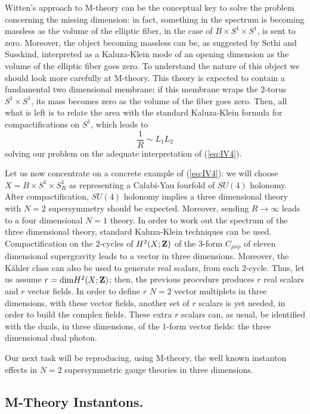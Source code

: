 Witten's approach to M-theory can be the
conceptual key to solve the problem concerning the missing dimension: in fact, something in the spectrum
is becoming massless as the volume of the elliptic fiber, in the 
case of $B \times S^1 \times S^1$, is sent to zero. Moreover, the
object becoming massless can be, as suggested by Sethi and
Susskind, interpreted as a Kaluza-Klein mode of an opening
dimension as the volume of the elliptic fiber goes zero. To
understand the nature of this object we should look more
carefully at M-theory. This theory is expected to contain a
fundamental two dimensional membrane; if this membrane wraps the
$2$-torus $S^1 \times S^1$, its mass becomes zero as the volume
of the fiber goes zero. Then, all what is left is to relate the
area with the standard Kaluza-Klein formula for compactifications
on $S^1$, which leads to 
\begin{equation}
\frac {1}{R} \sim L_1 L_2
\label{eq:IV8}
\end{equation}
solving our problem on the adequate interpretation of
(\ref{eq:IV4}).
  
Let us now concentrate on a concrete example of
(\ref{eq:IV4}): we will choose $X=B\times S^1 \times S^1_R$ as
representing a Calabi-Yau fourfold of $SU(4)$ holonomy. After
compactification, $SU(4)$ holonomy implies a three dimensional
theory with $N=2$ supersymmetry should be expected. Moreover,
sending $R \rightarrow \infty$ leads to a four dimensional $N=1$
theory. In order to work out the spectrum of the three
dimensional theory, standard Kaluza-Klein techniques can be used.
Compactification on the $2$-cycles of $H^2(X;{\bf Z})$ of the
$3$-form $C_{\mu \nu \rho}$ of eleven dimensional supergravity 
leads to a vector in three dimensions. Moreover, the K\"ahler
class can also be used to generate real scalars, from each
$2$-cycle. Thus, let us assume $r= \hbox {dim} H^2(X;{\bf Z})$;
then, the previous procedure produces $r$ real scalars and $r$ 
vector fields. In order to define $r$ $N=2$ vector multiplets in
three dimensions, with these vector fields, another set of
$r$ scalars is yet needed, in order to build the complex fields.
These extra $r$ scalars can, as usual, be identified with the
duals, in three dimensions, of the $1$-form vector fields: the three dimensional 
dual photon. 
  
Our next task will be reproducing, using M-theory, the well known
instanton effects in $N=2$ supersymmetric gauge theories in three
dimensions.

\subsection{M-Theory Instantons.}
\label{sec:Witins}


